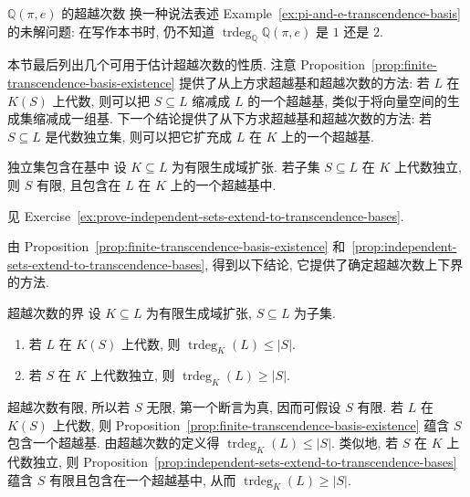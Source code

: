 \begin{Example}{$\mathbb{Q}(\pi,e)$ 的超越次数}\leavevmode\label{ex:transcendence-degree-pi-e}
换一种说法表述 Example~\ref{ex:pi-and-e-transcendence-basis} 的未解问题: 在写作本书时, 仍不知道 $\operatorname{trdeg}_{\mathbb{Q}}\mathbb{Q}(\pi,e)$ 是 $1$ 还是 $2$.
\end{Example}

本节最后列出几个可用于估计超越次数的性质. 注意 Proposition~\ref{prop:finite-transcendence-basis-existence} 提供了\textquotedbl{}从上方\textquotedbl{}求超越基和超越次数的方法: 若 $L$ 在 $K(S)$ 上代数, 则可以把 $S\subseteq L$ 缩减成 $L$ 的一个超越基, 类似于将向量空间的生成集缩减成一组基. 下一个结论提供了\textquotedbl{}从下方\textquotedbl{}求超越基和超越次数的方法: 若 $S\subseteq L$ 是代数独立集, 则可以把它扩充成 $L$ 在 $K$ 上的一个超越基.

\begin{Proposition}{独立集包含在基中}\leavevmode\label{prop:independent-sets-extend-to-transcendence-bases}
设 $K\subseteq L$ 为有限生成域扩张. 若子集 $S\subseteq L$ 在 $K$ 上代数独立, 则 $S$ 有限, 且包含在 $L$ 在 $K$ 上的一个超越基中.
\end{Proposition}
\begin{Proof}
见 Exercise~\ref{ex:prove-independent-sets-extend-to-transcendence-bases}.
\end{Proof}

由 Proposition~\ref{prop:finite-transcendence-basis-existence} 和~\ref{prop:independent-sets-extend-to-transcendence-bases}, 得到以下结论, 它提供了确定超越次数上下界的方法.

\begin{Corollary}{超越次数的界}\leavevmode\label{cor:bounds-on-transcendence-degree}
设 $K\subseteq L$ 为有限生成域扩张, $S\subseteq L$ 为子集.
\begin{enumerate}
  \item\label{part:transcendence-degree-upper-bound} 若 $L$ 在 $K(S)$ 上代数, 则 $\operatorname{trdeg}_{K}(L)\leq|S|$.
  \item\label{part:transcendence-degree-lower-bound} 若 $S$ 在 $K$ 上代数独立, 则 $\operatorname{trdeg}_{K}(L)\geq|S|$.
\end{enumerate}
\end{Corollary}
\begin{Proof}
超越次数有限, 所以若 $S$ 无限, 第一个断言为真, 因而可假设 $S$ 有限. 若 $L$ 在 $K(S)$ 上代数, 则 Proposition~\ref{prop:finite-transcendence-basis-existence} 蕴含 $S$ 包含一个超越基. 由超越次数的定义得 $\operatorname{trdeg}_{K}(L)\leq|S|$. 类似地, 若 $S$ 在 $K$ 上代数独立, 则 Proposition~\ref{prop:independent-sets-extend-to-transcendence-bases} 蕴含 $S$ 有限且包含在一个超越基中, 从而 $\operatorname{trdeg}_{K}(L)\geq|S|$.
\end{Proof}

